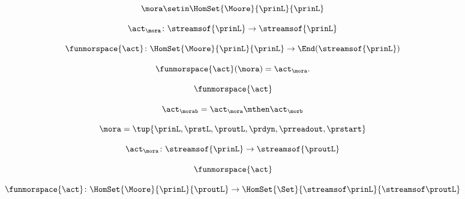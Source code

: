 \begin{forslides}
    \begin{equation}
        \label{eq:slides-processes-18}
        \mora \setin \HomSet{\Moore}{\prinL}{\prinL}
    \end{equation}

    \begin{equation}
        \label{eq:slides-processes-19}
        \act_{\mora} \colon \streamsof{\prinL} \to \streamsof{\prinL}
    \end{equation}
    
    \begin{equation}
        \label{eq:slides-processes-20}
        \funmorspace{\act} \colon  \HomSet{\Moore}{\prinL}{\prinL} \to \End (\streamsof{\prinL})
    \end{equation}

    \begin{equation}
        \label{eq:slides-processes-21}
        \funmorspace{\act}(\mora) = \act_{\mora}.
    \end{equation}

    \begin{equation}
        \label{eq:slides-processes-22}
        \funmorspace{\act}
    \end{equation}

    \begin{equation}
        \label{eq:slides-processes-23}
        \act_{\morab} = \act_\mora \mthen \act_\morb
    \end{equation}

    \begin{equation}
        \label{eq:slides-processes-24}
        \mora = \tup{\prinL,\prstL,\proutL,\prdyn,\prreadout,\prstart}
    \end{equation}

    \begin{equation}
        \label{eq:slides-processes-25}
        \act_{\mora} \colon \streamsof{\prinL} \to \streamsof {\proutL}
    \end{equation}

    \begin{equation}
        \label{eq:slides-processes-26}
        \funmorspace{\act}
    \end{equation}

    \begin{equation}
        \label{eq:slides-processes-27}
        \funmorspace{\act} \colon  \HomSet{\Moore}{\prinL}{\proutL} \to \HomSet{\Set}{\streamsof\prinL}{\streamsof\proutL}
    \end{equation}


\end{forslides}
